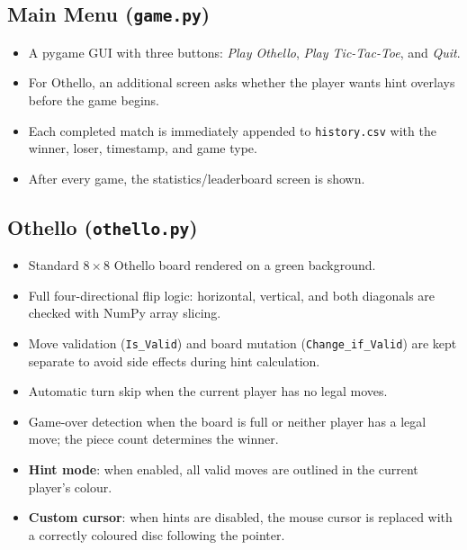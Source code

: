 \documentclass[12pt]{article}
\begin{document}
\subsection{Main Menu (\texttt{game.py})}
\begin{itemize}
    \item A pygame GUI with three buttons: \textit{Play Othello}, \textit{Play Tic-Tac-Toe}, and \textit{Quit}.
    \item For Othello, an additional screen asks whether the player wants hint overlays before the game begins.
    \item Each completed match is immediately appended to \texttt{history.csv} with the winner, loser, timestamp, and game type.
    \item After every game, the statistics/leaderboard screen is shown.
\end{itemize}

\subsection{Othello (\texttt{othello.py})}
\begin{itemize}
    \item Standard $8 \times 8$ Othello board rendered on a green background.
    \item Full four-directional flip logic: horizontal, vertical, and both diagonals are checked with NumPy array slicing.
    \item Move validation (\texttt{Is\_Valid}) and board mutation (\texttt{Change\_if\_Valid}) are kept separate to avoid side effects during hint calculation.
    \item Automatic turn skip when the current player has no legal moves.
    \item Game-over detection when the board is full or neither player has a legal move; the piece count determines the winner.
    \item \textbf{Hint mode}: when enabled, all valid moves are outlined in the current player's colour.
    \item \textbf{Custom cursor}: when hints are disabled, the mouse cursor is replaced with a correctly coloured disc following the pointer.
\end{itemize}
\end{document}
